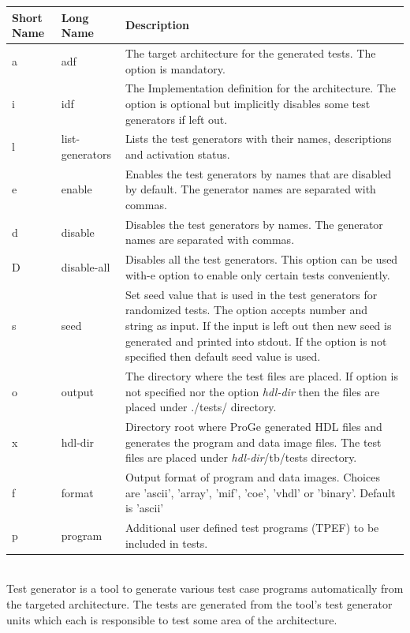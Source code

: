 \documentclass[a4paper,twoside]{tceusermanual}
\begin{document}
\begin{tabular}{p{}p{}
                p{}}

\textbf{Short Name} &\textbf{Long Name} &\textbf{Description} \\
\hline
a & adf & The target architecture for the generated tests. The option
is mandatory. \\
i & idf & The Implementation definition for the architecture. The option is
optional but implicitly disables some test generators if left out.\\
l & list-generators & Lists the test generators with their names, descriptions
and activation status.\\
e & enable & Enables the test generators by names that are disabled by
default. The generator names are separated with commas. \\
d & disable & Disables the test generators by names. The generator names are
separated with commas.\\
D & disable-all & Disables all the test generators. This option can be
used with-e option to enable only certain tests conveniently. \\
s & seed & Set seed value that is used in the test generators for
randomized tests. The option accepts number and string as input.
If the input is left out then new seed is generated and printed into
stdout. If the option is not specified then default seed value is used. \\
o & output & The directory where the test files are placed. If option is not
specified nor the option \emph{hdl-dir} then the files are placed
under ./tests/ directory.\\
x & hdl-dir & Directory root where ProGe generated HDL files and generates
the program and data image files. The test files are placed under
\emph{hdl-dir}/tb/tests directory.\\
f & format & Output format of program and data images. Choices are 'ascii',
'array', 'mif', 'coe', 'vhdl' or 'binary'. Default is 'ascii' \\
p & program & Additional user defined test programs (TPEF) to be included
in tests.\\

\end{tabular}\\

Test generator is a tool to generate various test case programs
automatically from the targeted architecture. The tests are generated
from the tool's test generator units which each is responsible to test
some area of the architecture.
\end{document}

